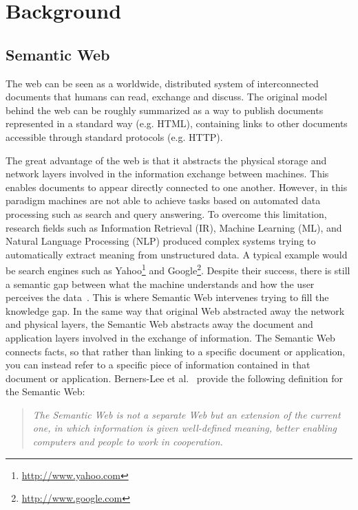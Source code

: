 \chapter{Background} \label{ch:background}
\graphicspath{{Background/figures/}}

\section{Semantic Web} \label{sec:sematic-web}

The web can be seen as a worldwide, distributed system of interconnected documents that humans can read, exchange and discuss. The original model behind the web can be roughly summarized as a way to publish documents represented in a standard way (e.g. HTML), containing links to other documents accessible through standard protocols (e.g. HTTP).

The great advantage of the web is that it abstracts the physical storage and network layers involved in the information exchange between machines. This enables documents to appear directly connected to one another. However, in this paradigm machines are not able to achieve tasks based on automated data processing such as search and query answering. To overcome this limitation, research fields such as Information Retrieval (IR), Machine Learning (ML), and Natural Language Processing (NLP) produced complex systems trying to automatically extract meaning from unstructured data. A typical example would be search engines such as Yahoo\footnote{\url{http://www.yahoo.com}} and Google\footnote{\url{http://www.google.com}}. Despite their success, there is still a semantic gap between what the machine understands and how the user perceives the data~\cite{Mika:book:07}. This is where Semantic Web intervenes trying to fill the knowledge gap. In the same way that original Web abstracted away the network and physical layers, the Semantic Web abstracts away the document and application layers involved in the exchange of information. The Semantic Web connects facts, so that rather than linking to a specific document or application, you can instead refer to a specific piece of information contained in that document or application. Berners-Lee et al.~\cite{BernersLee:ScientificAmerican:01} provide the following definition for the Semantic Web:

\begin{quote}
	\emph{The Semantic Web is not a separate Web but an extension of the current one, in which information is given well-defined meaning, better enabling computers and people to work in cooperation.}
\end{quote}

